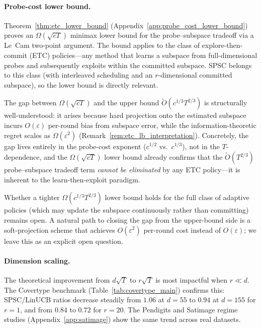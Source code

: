 \documentclass{article}
\begin{document}
\paragraph{Probe-cost lower bound.}
  Theorem~\ref{thm:etc_lower_bound} (Appendix~\ref{app:probe_cost_lower_bound}) proves an $\Omega(\sqrt{cT})$ minimax lower bound for
   the probe--subspace tradeoff via a Le~Cam two-point argument. The bound applies to the class of explore-then-commit (ETC)
  policies---any method that learns a subspace from full-dimensional probes and subsequently exploits within the committed subspace.
  SPSC belongs to this class (with interleaved scheduling and an $r$-dimensional committed subspace), so the lower bound is directly
  relevant.

  The gap between $\Omega(\sqrt{cT})$ and the upper bound $\widetilde{O}(c^{1/3}T^{2/3})$ is structurally well-understood: it arises
  because hard projection onto the estimated subspace incurs $O(\varepsilon)$ per-round bias from subspace error, while the
  information-theoretic regret scales as $\Omega(\varepsilon^2)$ (Remark~\ref{rem:etc_lb_interpretation}). Concretely, the gap lives
  entirely in the probe-cost exponent ($c^{1/2}$ vs.\ $c^{1/3}$), not in the $T$-dependence, and the $\Omega(\sqrt{cT})$ lower bound
  already confirms that the $\widetilde{O}(T^{2/3})$ probe--subspace tradeoff term \emph{cannot be eliminated} by any ETC policy---it
   is inherent to the learn-then-exploit paradigm.

  Whether a tighter $\Omega(c^{1/3}T^{2/3})$ lower bound holds for the full class of adaptive policies (which may update the subspace
   continuously rather than committing) remains open. A natural path to closing the gap from the upper-bound side is a
  soft-projection scheme that achieves $O(\varepsilon^2)$ per-round cost instead of $O(\varepsilon)$; we leave this as an explicit
  open question.

\paragraph{Dimension scaling.}
  The theoretical improvement from $d\sqrt{T}$ to $r\sqrt{T}$ is most impactful when $r \ll d$.
  The Covertype benchmark (Table~\ref{tab:covertype_main}) confirms this: SPSC/LinUCB ratios decrease steadily from $1.06$ at
  $d{=}55$ to $0.94$ at $d{=}155$ for $r{=}1$, and from $0.84$ to $0.72$ for $r{=}20$. The Pendigits and Satimage regime studies
  (Appendix~\ref{app:satimage}) show the same trend across real datasets.
\end{document}
